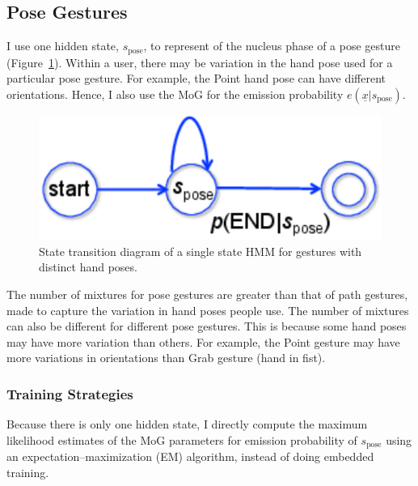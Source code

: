 \subsection{Pose Gestures}
I use one hidden state, $s_{\text{pose}}$, to represent of the nucleus phase of
a pose gesture (Figure~\ref{fig:single}). Within a user,
there may be variation in the hand pose used for a particular pose gesture.
For example, the Point hand pose can have different orientations.
Hence, I also use the MoG for the emission probability
$e(\underline{x} | s_\text{pose})$. 

\begin{figure}[tbh]
\centering
\includegraphics[width=0.5\columnwidth]{figures/single_state.pdf}
\caption{State transition diagram of a single state HMM for gestures with
distinct hand poses. }
\label{fig:single}
\end{figure}

The number of mixtures for pose gestures are greater than that of path
gestures, made to capture the variation in hand poses people use. The number
of mixtures can also be different for different pose gestures.
This is because some hand poses may have more variation than others.
For example, the Point gesture may have more variations in orientations than
Grab gesture (hand in fist).

\subsubsection{Training Strategies}\label{sec:pose-gesture}
Because there is only
one hidden state, I directly compute the maximum likelihood estimates of the MoG
parameters for emission probability of $s_{\text{pose}}$ using an
expectation--maximization (EM) algorithm, instead of doing embedded training.

